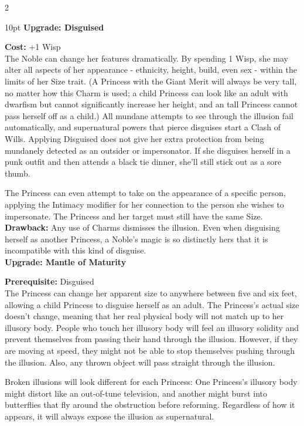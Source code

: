 \begin{multicols}{2}
\begin{myindentpar}{10pt}
\textbf{Upgrade: Disguised}

\noindent \textbf{Cost:} +1 Wisp\\

\noindent The Noble can change her features dramatically. By spending 1 Wisp, she may alter all aspects of her appearance - ethnicity, height, build, even sex - within the limits of her Size trait. (A Princess with the Giant Merit will always be very tall, no matter how this Charm is used; a child Princess can look like an adult with dwarfism but cannot significantly increase her height, and an tall Princess cannot pass herself off as a child.) All mundane attempts to see through the illusion fail automatically, and supernatural powers that pierce disguises start a Clash of Wills. Applying Disguised does not give her extra protection from being mundanely detected as an outsider or impersonator. If she disguises herself in a punk outfit and then attends a black tie dinner, she'll still stick out as a sore thumb. 

The Princess can even attempt to take on the appearance of a specific person, applying the Intimacy modifier for her connection to the person she wishes to impersonate. The Princess and her target must still have the same Size.\\

\noindent \textbf{Drawback:} Any use of Charms dismisses the illusion. Even when disguising herself as another Princess, a Noble's magic is so distinctly hers that it is incompatible with this kind of disguise.  \\

\textbf{Upgrade: Mantle of Maturity}

\noindent \textbf{Prerequisite:} Disguised\\

The Princess can change her apparent size to anywhere between five and six feet, allowing a child Princess to disguise herself as an adult. The Princess's actual size doesn't change, meaning that her real physical body will not match up to her illusory body. People who touch her illusory body will feel an illusory solidity and prevent themselves from passing their hand through the illusion. However, if they are moving at speed, they might not be able to stop themselves pushing through the illusion. Also, any thrown object will pass straight through the illusion. 

Broken illusions will look different for each Princess: One Princess's illusory body might distort like an out-of-tune television, and another might burst into butterflies that fly around the obstruction before reforming. Regardless of how it appears, it will always expose the illusion as supernatural. 


\end{myindentpar}
\end{multicols}
